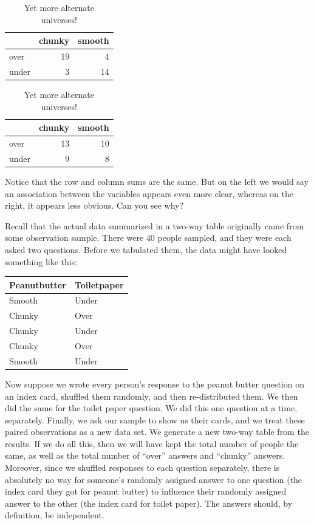 \documentclass[
  openany]{book}
\begin{document}
\begin{table}[!h]
\caption{\label{tab:unnamed-chunk-8}Yet more alternate universes!}

\centering
\begin{tabular}[t]{lrr}
\toprule
  & chunky & smooth\\
\midrule
over & 19 & 4\\
under & 3 & 14\\
\bottomrule
\end{tabular}
\centering
\begin{tabular}[t]{lrr}
\toprule
  & chunky & smooth\\
\midrule
over & 13 & 10\\
under & 9 & 8\\
\bottomrule
\end{tabular}
\end{table}

Notice that the row and column sums are the same. But on the left we would say an association between the variables appears even more clear, whereas on the right, it appears less obvious. Can you see why?

Recall that the actual data summarized in a two-way table originally came from some observation sample. There were 40 people sampled, and they were each asked two questions. Before we tabulated them, the data might have looked something like this:

\begin{table}[!h]
\centering
\begin{tabular}{l|l}
\hline
Peanutbutter & Toiletpaper\\
\hline
Smooth & Under\\
\hline
Chunky & Over\\
\hline
Chunky & Under\\
\hline
Chunky & Over\\
\hline
Smooth & Under\\
\hline
\end{tabular}
\end{table}

Now suppose we wrote every person's response to the peanut butter question on an index card, shuffled them randomly, and then re-distributed them. We then did the same for the toilet paper question. We did this one question at a time, separately. Finally, we ask our sample to show us their cards, and we treat these paired observations as a new data set. We generate a new two-way table from the results. If we do all this, then we will have kept the total number of people the same, as well as the total number of ``over'' answers and ``chunky'' answers. Moreover, since we shuffled responses to each question separately, there is absolutely no way for someone's randomly assigned answer to one question (the index card they got for peanut butter) to influence their randomly assigned answer to the other (the index card for toilet paper). The answers should, by definition, be independent.
\end{document}
